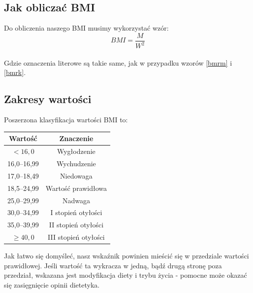 \documentclass{article}
\begin{document}
\subsection{Jak obliczać BMI}
Do obliczenia naszego BMI musimy wykorzystać wzór:
$$BMI = \frac{M}{W^2}$$ \\
Gdzie oznaczenia literowe są takie same, jak w przypadku wzorów \ref{bmrm} i \ref{bmrk}.

\subsection{Zakresy wartości}
Poszerzona klasyfikacja wartości BMI to:
\begin{center}
\begin{tabular}{|c|c|}
\hline
Wartość & Znaczenie \\
\hline 
\hline
$< 16,0$ & Wygłodzenie \\ 
\hline 
16,0–16,99 & Wychudzenie \\
\hline 
17,0–18,49 & Niedowaga \\
\hline
18,5–24,99 & Wartość prawidłowa \\
\hline
25,0–29,99 & Nadwaga \\
\hline
30,0–34,99 & I stopień otyłości \\
\hline
35,0–39,99 & II stopień otyłości \\
\hline
$≥ 40,0$ & III stopień otyłości \\
\hline

\end{tabular} \label{bmi}
\end{center}
Jak łatwo się domyśleć, nasz wskaźnik powinien mieścić się w przedziale wartości prawidłowej. Jeśli wartość ta wykracza w jedną, bądź drugą stronę poza przedział, wskazana jest modyfikacja diety i trybu życia - pomocne może okazać się zasięgnięcie opinii dietetyka.
\newpage
\end{document}
